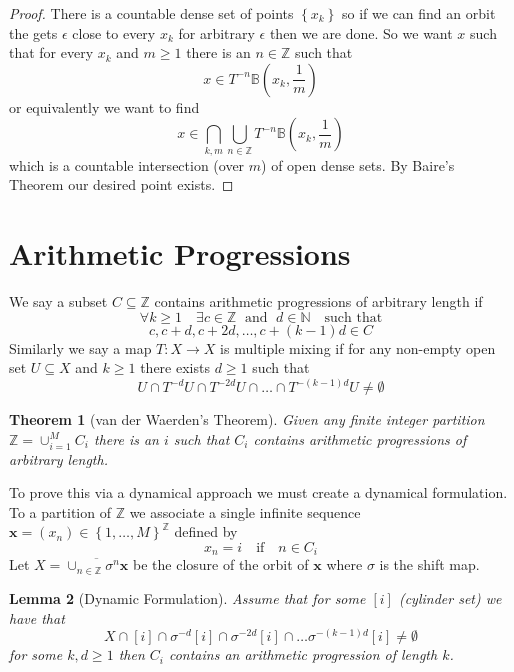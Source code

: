 \documentclass[11pt]{article}
\newcommand{\Z}{\mathbb{Z}}
\newcommand{\N}{\mathbb{N}}
\newcommand{\mv}[1]{\textbf{#1}}
\newenvironment{defin}
	{\begin{mdframed}[backgroundcolor=white, roundcorner=5pt, linewidth=1pt, linecolor=Green]
		\setlength{\parindent}{0pt}}
	{\end{mdframed}}
\newcommand{\mdf}[1]{{\color{Green} #1}}
\newtheorem{theorem}{Theorem}[section]
\newtheorem{lemma}[theorem]{Lemma}
\begin{document}
\begin{proof}
There is a countable dense set of points $\left\{x_k\right\}$ so if we can find an orbit the gets $\epsilon$ close to every $x_k$ for arbitrary $\epsilon$ then we are done.
So we want $x$ such that for every $x_k$ and $m\geq 1$ there is an $n\in\Z$ such that
\[
	x\in T^{-n}\mathbb{B}\left(x_k,\frac{1}{m}\right)
\]
or equivalently we want to find
\[
	x\in\bigcap_{k, m}\bigcup_{n\in\Z}T^{-n}\mathbb{B}\left(x_k,\frac{1}{m}\right)
\]
which is a countable intersection (over $m$) of open dense sets.
By Baire's Theorem our desired point exists.
\end{proof}


\section{Arithmetic Progressions}
\begin{defin}
	We say a subset $C\subseteq \Z$ \mdf{contains arithmetic progressions of arbitrary length} if
\[
	\forall k \geq 1 \quad \exists c\in \Z \;\text{ and }\; d\in\N \quad \text{such that}
\]\[
	c, c+d, c+ 2d, \dots, c+ (k-1)d\in C
\]
Similarly we say a map $T:X\to X$ is \mdf{multiple mixing} if for any non-empty open set $U\subseteq X$ and $k\geq 1$ there exists $d\geq 1$ such that
\[
	U\cap T^{-d}U \cap T^{-2d}U \cap \dots \cap T^{-(k-1)d}U\neq \emptyset
\]
\end{defin}

\begin{theorem}[van der Waerden's Theorem]
Given any finite integer partition $\Z=\cup_{i=1}^M C_i$ there is an $i$ such that $C_i$ contains arithmetic progressions of arbitrary length.
\end{theorem}

To prove this via a dynamical approach we must create a dynamical formulation.
To a partition of $\Z$ we associate  a single infinite sequence $\mv{x}=(x_n)\in\left\{1, \dots, M\right\}^\Z$ defined by
\[
	x_n=i\quad\text{if}\quad n\in C_i
\]
Let $X=\overline{\cup_{n\in\Z}\sigma^n\mv{x}}$ be the closure of the orbit of $\mv{x}$ where $\sigma$ is the shift map.

\begin{lemma}[Dynamic Formulation]
Assume that for some $[i]$ (cylinder set) we have that
\[
	X\cap [i] \cap \sigma^{-d}[i]\cap \sigma^{-2d}[i] \cap \dots \sigma^{-(k-1)d}[i]\neq\emptyset
\]
for some $k,d\geq 1$ then $C_i$ contains an arithmetic progression of length $k$.
\end{lemma}
\end{document}
